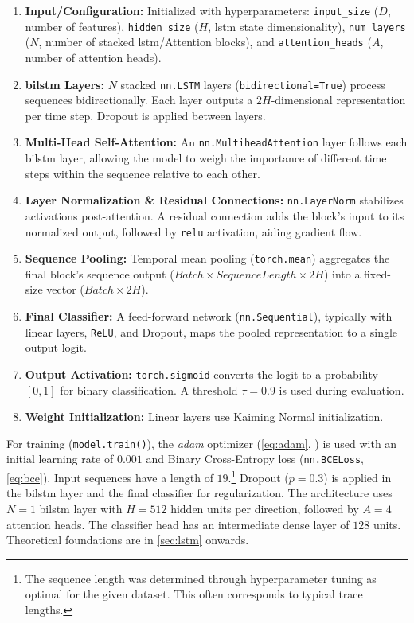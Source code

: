 \begin{enumerate}
  \item \textbf{Input/Configuration:} Initialized with hyperparameters: \texttt{input\_size} ($D$, number of features), \texttt{hidden\_size} ($H$, \gls{lstm} state dimensionality), \texttt{num\_layers} ($N$, number of stacked \gls{lstm}/Attention blocks), and \texttt{attention\_heads} ($A$, number of attention heads).

  \item \textbf{\gls{bilstm} Layers:} $N$ stacked \texttt{nn.LSTM} layers (\texttt{bidirectional=True}) process sequences bidirectionally. Each layer outputs a $2H$-dimensional representation per time step. Dropout is applied between layers.

  \item \textbf{Multi-Head Self-Attention:} An \texttt{nn.MultiheadAttention} layer follows each \gls{bilstm} layer, allowing the model to weigh the importance of different time steps within the sequence relative to each other.

  \item \textbf{Layer Normalization \& Residual Connections:} \texttt{nn.LayerNorm} stabilizes activations post-attention. A residual connection adds the block's input to its normalized output, followed by \texttt{\gls{relu}} activation, aiding gradient flow.

  \item \textbf{Sequence Pooling:} Temporal mean pooling (\texttt{torch.mean}) aggregates the final block's sequence output ($Batch \times Sequence Length \times 2H$) into a fixed-size vector ($Batch \times 2H$).

  \item \textbf{Final Classifier:} A feed-forward network (\texttt{nn.Sequential}), typically with linear layers, \texttt{ReLU}, and Dropout, maps the pooled representation to a single output logit.

  \item \textbf{Output Activation:} \texttt{torch.sigmoid} converts the logit to a probability $[0, 1]$ for binary classification. A threshold $\tau = 0.9$ is used during evaluation.

  \item \textbf{Weight Initialization:} Linear layers use Kaiming Normal initialization.
\end{enumerate}

For training (\texttt{model.train()}), the \textit{\gls{adam}} optimizer (\autoref{eq:adam}, \autocite{kingma2014adam}) is used with an initial learning rate of $0.001$ and Binary Cross-Entropy loss (\texttt{nn.BCELoss}, \autoref{eq:bce}). Input sequences have a length of $19$.\footnote{The sequence length was determined through hyperparameter tuning as optimal for the given dataset. This often corresponds to typical trace lengths.} Dropout ($p=0.3$) is applied in the \gls{bilstm} layer and the final classifier for regularization. The architecture uses $N=1$ \gls{bilstm} layer with $H=512$ hidden units per direction, followed by $A=4$ attention heads. The classifier head has an intermediate dense layer of $128$ units. Theoretical foundations are in \autoref{sec:lstm} onwards.

